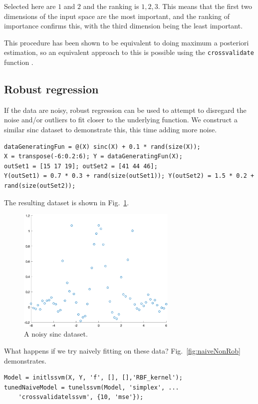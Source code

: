 \documentclass[10pt,a4paper]{article}
\begin{document}
Selected here are $1$ and $2$ and the ranking is $1, 2, 3$. This means that the first two dimensions of the input space are the most important, and the ranking of importance confirms this, with the third dimension being the least important.

This procedure has been shown to be equivalent to doing maximum a posteriori estimation, so an equivalent approach to this is possible using the \texttt{crossvalidate} function \cite{wipfNewViewAutomatic}.

\subsection{Robust regression}
If the data are noisy, robust regression can be used to attempt to disregard the noise and/or outliers to fit closer to the underlying function. We construct a similar sinc dataset to demonstrate this, this time adding more noise.

\begin{lstlisting}[style=Matlab-editor, frame=single]
dataGeneratingFun = @(X) sinc(X) + 0.1 * rand(size(X));
X = transpose(-6:0.2:6); Y = dataGeneratingFun(X);
outSet1 = [15 17 19]; outSet2 = [41 44 46];
Y(outSet1) = 0.7 * 0.3 + rand(size(outSet1)); Y(outSet2) = 1.5 * 0.2 + rand(size(outSet2)); 
\end{lstlisting}

The resulting dataset is shown in Fig.~\ref{fig:noisyData}.

\begin{figure}[h!]
\centering
  \includegraphics[width=3in]{noisyData.png}
  \caption{A noisy sinc dataset.}
  \label{fig:noisyData}
\end{figure}

What happens if we try naively fitting on these data? Fig.~\ref{fig:naiveNonRob} demonstrates.

\begin{lstlisting}[style=Matlab-editor, frame=single]
Model = initlssvm(X, Y, 'f', [], [],'RBF_kernel');
tunedNaiveModel = tunelssvm(Model, 'simplex', ...
    'crossvalidatelssvm', {10, 'mse'});
\end{lstlisting}
\end{document}
